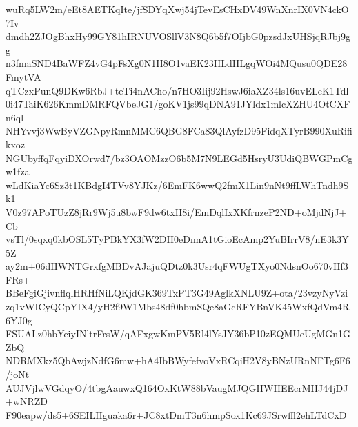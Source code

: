 wuRq5LW2m/eEt8AETKqIte/jfSDYqXwj54jTevEsCHxDV49WnXnrIX0VN4ckO7Iv
dmdh2ZJOgBhxHy99GY81hIRNUVOSllV3N8Q6b5f7OIjbG0pzsdJxUHSjqRJbj9gg
n3fmaSND4BaWFZ4vG4pFsXg0N1H8O1vaEK23HLdHLgqWOi4MQusu0QDE28FmytVA
qTCzxPunQ9DKw6RbJ+teTi4nACho/n7HO3Iij92HswJ6iaXZ34ls16uvELeK1Tdl
0i47TaiK626KmmDMRFQVbeJG1/goKV1js99qDNA91JYldx1mlcXZHU4OtCXFn6ql
NHYvvj3WwByVZGNpyRmnMMC6QBG8FCa83QlAyfzD95FidqXTyrB990XuRifikxoz
NGUbyffqFqyiDXOrwd7/bz3OAOMzzO6b5M7N9LEGd5HsryU3UdiQBWGPmCgw1fza
wLdKiaYc6Sz3t1KBdgI4TVv8YJKz/6EmFK6wwQ2fmX1Lin9nNt9ffLWhTndh9Sk1
V0z97APoTUzZ8jRr9Wj5u8bwF9dw6txH8i/EmDqlIxXKfrnzeP2ND+oMjdNjJ+Cb
vsTl/0sqxq0kbOSL5TyPBkYX3fW2DH0eDnnA1tGioEcAmp2YuBIrrV8/nE3k3Y5Z
ay2m+06dHWNTGrxfgMBDvAJajuQDtz0k3Usr4qFWUgTXyo0NdsnOo670vHf3FRs+
BBeFgiGjivnflqlHRHfNiLQKjdGK369TxPT3G49AglkXNLU9Z+ota/23vzyNyVzi
zq1vWICyQCpYIX4/yH2f9W1Mbs48df0hbmSQe8aGcRFYBnVK45WxfQdVm4R6YJ0g
FSUALz0hbYeiyINltrFrsW/qAFxgwKmPV5Rl4lYsJY36bP10zEQMUeUgMGn1GZbQ
NDRMXkz5QbAwjzNdfG6mw+hA4IbBWyfefvoVxRCqiH2V8yBNzURnNFTg6F6/joNt
AUJVjlwVGdqyO/4tbgAauwxQ164OxKtW88bVaugMJQGHWHEEcrMHJ44jDJ+wNRZD
F90eapw/ds5+6SEILHguaka6r+JC8xtDmT3n6hmpSox1Kc69JSrwffl2ehLTdCxD
